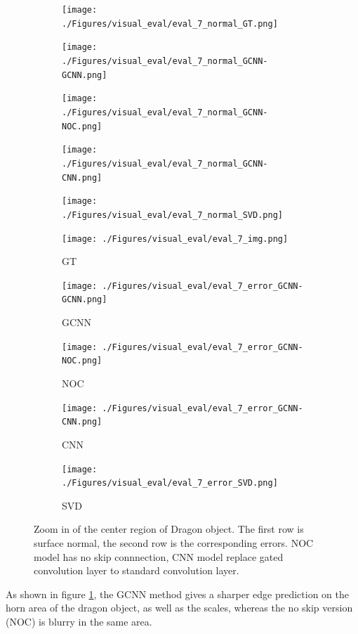\documentclass[border=15pt, multi, tikz]{article}
\begin{document}
\begin{figure}[H]
	\centering
	\begin{subfigure}[b]{0.18\linewidth}
		\texttt{[image: ./Figures/visual\_eval/eval\_7\_normal\_GT.png]}
	\end{subfigure}
	\begin{subfigure}[b]{0.18\linewidth}
		\texttt{[image: ./Figures/visual\_eval/eval\_7\_normal\_GCNN-GCNN.png]}
	\end{subfigure}
	\begin{subfigure}[b]{0.18\linewidth}
		\texttt{[image: ./Figures/visual\_eval/eval\_7\_normal\_GCNN-NOC.png]}
	\end{subfigure}
	\begin{subfigure}[b]{0.18\linewidth}
		\texttt{[image: ./Figures/visual\_eval/eval\_7\_normal\_GCNN-CNN.png]}
	\end{subfigure}
	\begin{subfigure}[b]{0.18\linewidth}
		\texttt{[image: ./Figures/visual\_eval/eval\_7\_normal\_SVD.png]}
	\end{subfigure}
	
	\begin{subfigure}[b]{0.18\linewidth}
		\texttt{[image: ./Figures/visual\_eval/eval\_7\_img.png]}
		\caption{GT}
	\end{subfigure}
	\begin{subfigure}[b]{0.18\linewidth}
		\texttt{[image: ./Figures/visual\_eval/eval\_7\_error\_GCNN-GCNN.png]}
		\caption{GCNN}
	\end{subfigure}
	\begin{subfigure}[b]{0.18\linewidth}
		\texttt{[image: ./Figures/visual\_eval/eval\_7\_error\_GCNN-NOC.png]}
		\caption{NOC}
	\end{subfigure}
	\begin{subfigure}[b]{0.18\linewidth}
		\texttt{[image: ./Figures/visual\_eval/eval\_7\_error\_GCNN-CNN.png]}
		\caption{CNN}
	\end{subfigure}
	\begin{subfigure}[b]{0.18\linewidth}
		\texttt{[image: ./Figures/visual\_eval/eval\_7\_error\_SVD.png]}
		\caption{SVD}
	\end{subfigure}
	
	\caption{Zoom in of the center region of Dragon object. The first row is surface normal, the second row is the corresponding errors. NOC model has no skip connnection, CNN model replace gated convolution layer to standard convolution layer.}
	\label{fig:gcnn-eval-synthetic-zoom-in}
\end{figure}
As shown in figure \ref{fig:gcnn-eval-synthetic-zoom-in}, the GCNN method gives a sharper edge prediction on the horn area of the dragon object, as well as the scales, whereas the no skip version (NOC) is blurry in the same area.
\end{document}
